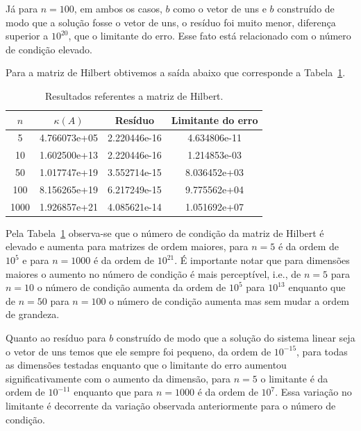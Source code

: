 \documentclass[12pt,a4paper]{article}
\begin{document}
J\'{a} para $n = 100$, em ambos os casos, $b$ como o vetor de uns e $b$
constru\'{i}do de modo que a solu\c{c}\~{a}o fosse o vetor de uns, o res\'{i}duo
foi muito menor, diferen\c{c}a superior a $10^{20}$, que o limitante do erro.
Esse fato est\'{a} relacionado com o n\'{u}mero de condi\c{c}\~{a}o elevado.

Para a matriz de Hilbert obtivemos a sa\'{i}da abaixo que corresponde a
Tabela~\ref{tab:res_matriz_hilbert}.

\begin{table}[!htb]
    \centering
    \caption{Resultados referentes a matriz de Hilbert.}
    \label{tab:res_matriz_hilbert}
    \begin{tabular}{|c|c|c|c|}
        \hline
        $n$ & $\kappa(A)$ & Res\'{i}duo & Limitante do erro \\ \hline
        5 & 4.766073e+05 & 2.220446e-16 & 4.634806e-11 \\ \hline
        10 & 1.602500e+13 & 2.220446e-16 & 1.214853e-03 \\ \hline
        50 & 1.017747e+19 & 3.552714e-15 & 8.036452e+03 \\ \hline
        100 & 8.156265e+19 & 6.217249e-15 & 9.775562e+04 \\ \hline
        1000 & 1.926857e+21 & 4.085621e-14 & 1.051692e+07 \\ \hline
    \end{tabular}
\end{table}

Pela Tabela~\ref{tab:res_matriz_hilbert} observa-se que o n\'{u}mero de
condi\c{c}\~{a}o da matriz de Hilbert \'{e} elevado e aumenta para matrizes de
ordem maiores, para $n = 5$ \'{e} da ordem
de $10^5$ e para $n = 1000$ \'{e} da ordem de $10^{21}$. \'{E} importante notar
que para dimens\~{o}es maiores o aumento no n\'{u}mero de condi\c{c}\~{a}o \'{e}
mais percept\'{i}vel, i.e., de $n = 5$ para $n = 10$ o n\'{u}mero de
condi\c{c}\~{a}o aumenta da ordem de $10^5$ para $10^{13}$ enquanto que de
$n = 50$ para $n = 100$ o n\'{u}mero de condi\c{c}\~{a}o aumenta mas sem mudar a
ordem de grandeza.

Quanto ao res\'{i}duo para $b$ constru\'{i}do de modo que a solu\c{c}\~{a}o do
sistema linear seja o vetor de uns temos que ele sempre foi pequeno, da ordem de
$10^{-15}$, para todas as dimens\~{o}es testadas enquanto que o limitante do erro
aumentou significativamente com o aumento da dimens\~{a}o, para $n = 5$ o
limitante \'{e} da ordem de $10^{-11}$ enquanto que para $n = 1000$ \'{e} da
ordem de $10^7$. Essa varia\c{c}\~{a}o no limitante \'{e} decorrente da
varia\c{c}\~{a}o observada anteriormente para o n\'{u}mero de condi\c{c}\~{a}o.
\end{document}

